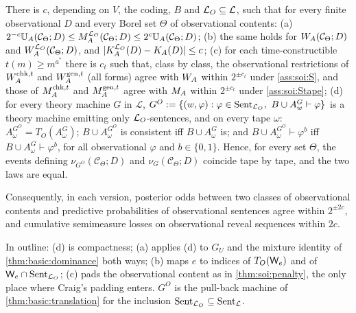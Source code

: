\begin{theorem}\label{thm:terms:horn}
There is $c$, depending on $V$, the coding, $B$ and $\mathcal{L}_{O}\subseteq\mathcal L$, such that for every finite observational $D$ and every Borel set $\Theta$ of observational contents:
(a) $2^{-c}\mathbb{U}_{A}(\mathcal C_\Theta;D)\le M_{A}^{\mathcal{L}_{O}}(\mathcal C_\Theta;D)\le2^c\mathbb{U}_{A}(\mathcal C_\Theta;D)$;
(b) the same holds for $W_{A}(\mathcal C_\Theta;D)$ and $W_{A}^{\mathcal{L}_{O}}(\mathcal C_\Theta;D)$, and $\lvert K_{A}^{\mathcal{L}_{O}}(D)-K_{A}(D)\rvert\le c$;
(c) for each time-constructible $t(m)\ge m^{a^*}$ there is $c_t$ such that, class by class, the observational restrictions of $W_{A}^{\mathrm{chk},t}$ and $W_{A}^{\mathrm{gen},t}$ (all forms) agree with $W_{A}$ within $2^{\pm c_t}$ under \cref{ass:soi:S}, and those of $M_{A}^{\mathrm{chk},t}$ and $M_{A}^{\mathrm{gen},t}$ agree with $M_{A}$ within $2^{\pm c_t}$ under \cref{ass:soi:Stape};
(d) for every theory machine $G$ in $\mathcal L$, $G^O:=\{(w,\varphi):\varphi\in\Sent_{\LO},\ B\cup A^G_w\vdash\varphi\}$ is a theory machine emitting only $\mathcal{L}_{O}$-sentences, and on every tape $\omega$: $A^{G^O}_\omega=T_O(A^G_\omega)$; $B\cup A^{G^O}_\omega$ is consistent iff $B\cup A^G_\omega$ is; and $B\cup A^{G^O}_\omega\vdash\varphi^b$ iff $B\cup A^G_\omega\vdash\varphi^b$, for all observational $\varphi$ and $b\in\{0,1\}$. Hence, for every set $\Theta$, the events defining $\nu_{G^O}(\mathcal C_\Theta;D)$ and $\nu_G(\mathcal C_\Theta;D)$ coincide tape by tape, and the two laws are equal.

\noindent Consequently, in each version, posterior odds between two classes of observational contents and predictive probabilities of observational sentences agree within $2^{\pm2c}$, and cumulative semimeasure losses on observational reveal sequences within $2c$.
\end{theorem}

In outline: (d) is compactness; (a) applies (d) to $G_U$ and the mixture identity of \cref{thm:basic:dominance} both ways; (b) maps $e$ to indices of $T_O(\mathsf{W}_{e})$ and of $\mathsf{W}_{e}\cap\mathrm{Sent}_{\mathcal{L}_{O}}$; (c) pads the observational content as in \cref{thm:soi:penalty}, the only place where Craig's padding enters. $G^O$ is the pull-back machine of \cref{thm:basic:translation} for the inclusion $\mathrm{Sent}_{\mathcal{L}_{O}}\subseteq\mathrm{Sent}_{\mathcal L}$.

